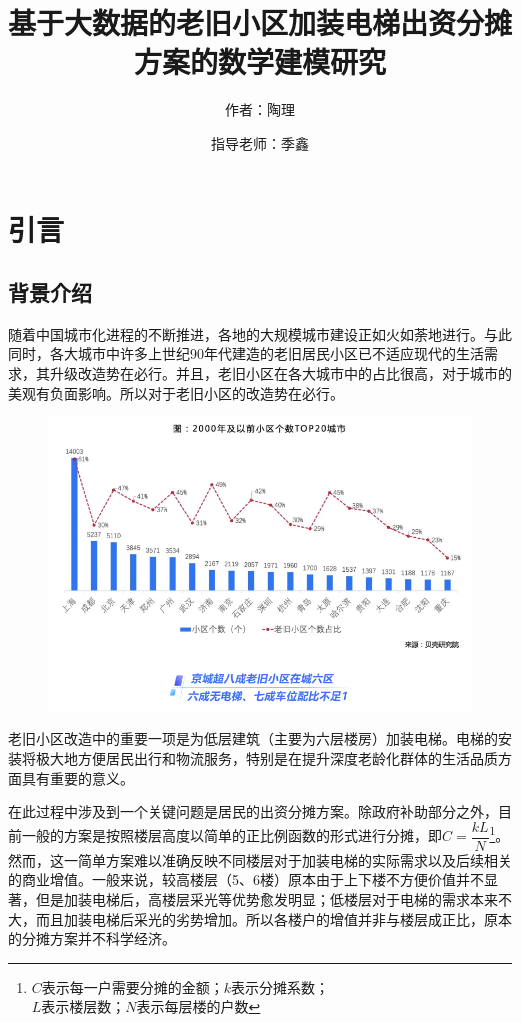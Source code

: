 \documentclass[lang=cn,a4paper]{elegantpaper}
\title{基于大数据的老旧小区加装电梯出资分摊方案的数学建模研究}
\author{作者：陶理 \and 指导老师：季鑫}
\institute{上海市实验学校}
\date{\zhtoday}
\begin{document}
    \maketitle
    
    \begin{abstract}
    \end{abstract}

    \section{引言}

    \subsection{背景介绍}

    随着中国城市化进程的不断推进，各地的大规模城市建设正如火如荼地进行。与此同时，各大城市中许多上世纪90年代建造的老旧居民小区已不适应现代的生活需求，其升级改造势在必行。并且，老旧小区在各大城市中的占比很高\cite{research.ke}，对于城市的美观有负面影响。所以对于老旧小区的改造势在必行。

    \begin{figure}[H]
        \centering
        \includegraphics[scale=0.3]{number of old.png}
    \end{figure}
    老旧小区改造中的重要一项是为低层建筑（主要为六层楼房）加装电梯。电梯的安装将极大地方便居民出行和物流服务，特别是在提升深度老龄化群体的生活品质方面具有重要的意义。
    
    在此过程中涉及到一个关键问题是居民的出资分摊方案。除政府补助部分之外，目前一般的方案是按照楼层高度以简单的正比例函数的形式进行分摊，即$C=\dfrac{kL}{N}$\footnote{$C$表示每一户需要分摊的金额；$k$表示分摊系数；\\$L$表示楼层数；$N$表示每层楼的户数}。然而，这一简单方案难以准确反映不同楼层对于加装电梯的实际需求以及后续相关的商业增值。一般来说，较高楼层（5、6楼）原本由于上下楼不方便价值并不显著，但是加装电梯后，高楼层采光等优势愈发明显；低楼层对于电梯的需求本来不大，而且加装电梯后采光的劣势增加。所以各楼户的增值并非与楼层成正比，原本的分摊方案并不科学经济。
    
\end{document}
